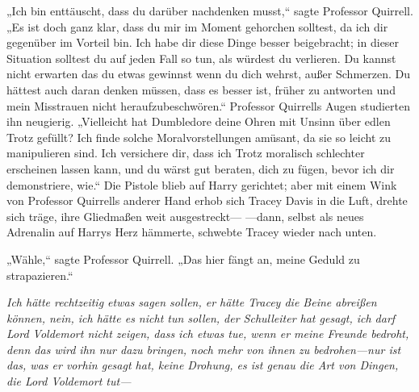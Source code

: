 „Ich bin enttäuscht, dass du darüber nachdenken musst,“ sagte Professor Quirrell.
„Es ist doch ganz klar, dass du mir im Moment gehorchen solltest, da ich dir gegenüber im Vorteil bin. Ich habe dir diese Dinge besser beigebracht; in dieser Situation solltest du auf jeden Fall so tun, als würdest du verlieren. Du kannst nicht erwarten das du etwas gewinnst wenn du dich wehrst, außer Schmerzen. Du hättest auch daran denken müssen, dass es besser ist, früher zu antworten und mein Misstrauen nicht heraufzubeschwören.“
Professor Quirrells Augen studierten ihn neugierig.
„Vielleicht hat Dumbledore deine Ohren mit Unsinn über edlen Trotz gefüllt? Ich finde solche Moralvorstellungen amüsant, da sie so leicht zu manipulieren sind. Ich versichere dir, dass ich Trotz moralisch schlechter erscheinen lassen kann, und du wärst gut beraten, dich zu fügen, bevor ich dir demonstriere, wie.“
Die Pistole blieb auf Harry gerichtet; aber mit einem Wink von Professor Quirrells anderer Hand erhob sich Tracey Davis in die Luft, drehte sich träge, ihre Gliedmaßen weit ausgestreckt—
—dann, selbst als neues Adrenalin auf Harrys Herz hämmerte, schwebte Tracey wieder nach unten.

„Wähle,“ sagte Professor Quirrell. „Das hier fängt an, meine Geduld zu strapazieren.“

\emph{Ich hätte rechtzeitig etwas sagen sollen, er hätte Tracey die Beine abreißen können, nein, ich hätte es nicht tun sollen, der Schulleiter hat gesagt, ich darf Lord Voldemort nicht zeigen, dass ich etwas tue, wenn er meine Freunde bedroht, denn das wird ihn nur dazu bringen, noch mehr von ihnen zu bedrohen—nur ist das, was er vorhin gesagt hat, keine \emph{Drohung}, es ist genau die Art von Dingen, die Lord Voldemort \emph{tut}—}

